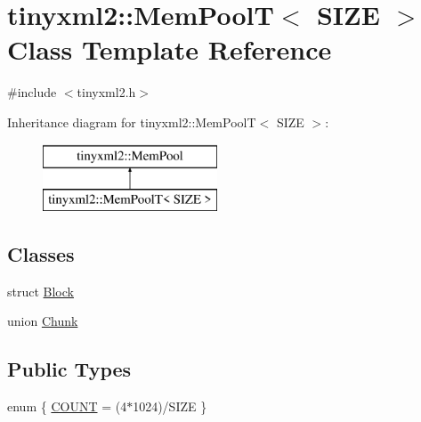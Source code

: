 \hypertarget{classtinyxml2_1_1_mem_pool_t}{\section{tinyxml2\-:\-:Mem\-Pool\-T$<$ S\-I\-Z\-E $>$ Class Template Reference}
\label{classtinyxml2_1_1_mem_pool_t}
}


{\ttfamily \#include $<$tinyxml2.\-h$>$}

Inheritance diagram for tinyxml2\-:\-:Mem\-Pool\-T$<$ S\-I\-Z\-E $>$\-:\begin{figure}[H]
\begin{center}
\leavevmode
\includegraphics[height=2.000000cm]{classtinyxml2_1_1_mem_pool_t}
\end{center}
\end{figure}
\subsection*{Classes}
\begin{DoxyCompactItemize}
\item 
struct \hyperlink{structtinyxml2_1_1_mem_pool_t_1_1_block}{Block}
\item 
union \hyperlink{uniontinyxml2_1_1_mem_pool_t_1_1_chunk}{Chunk}
\end{DoxyCompactItemize}
\subsection*{Public Types}
\begin{DoxyCompactItemize}
\item 
enum \{ \hyperlink{classtinyxml2_1_1_mem_pool_t_a04cf45156e6f913f93972869ff8a1d94a4eeedbaa09fc9968120af6190e9e0988}{C\-O\-U\-N\-T} = (4$\ast$1024)/\-S\-I\-Z\-E
 \}
\end{DoxyCompactItemize}
